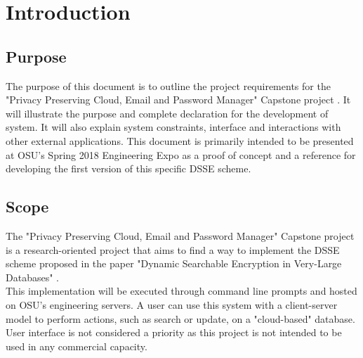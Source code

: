 \documentclass[onecolumn, draftclsnofoot,10pt, compsoc]{IEEEtran}
\begin{document}
        
      


\section{ Introduction }
\subsection{ Purpose }
The purpose of this document is to outline the project requirements for the "Privacy Preserving Cloud, Email and Password Manager" Capstone project \cite{capstone}. It will illustrate the purpose and complete declaration for the development of system. It will also explain system constraints, interface and interactions with other external applications. This document is primarily intended to be presented at OSU's Spring 2018 Engineering Expo as a proof of concept and a reference for developing the first version of this specific DSSE scheme.
\subsection{ Scope }
The "Privacy Preserving Cloud, Email and Password Manager" Capstone project is a research-oriented project that aims to find a way to implement the DSSE scheme proposed in the paper "Dynamic Searchable Encryption in Very-Large Databases" \cite{cash14}.\\
This implementation will be executed through command line prompts and hosted on OSU's engineering servers. A user can use this system with a client-server model to perform actions, such as search or update, on a "cloud-based" database. User interface is not considered a priority as this project is not intended to be used in any commercial capacity. 
\end{document}
